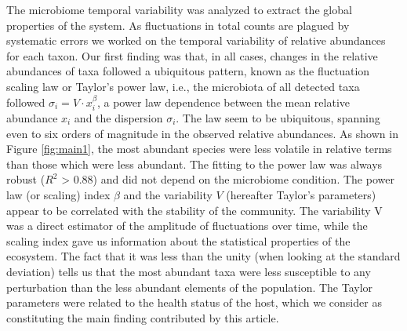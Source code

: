 
The microbiome temporal variability was analyzed to extract the global properties of the system. As fluctuations in total counts are plagued by systematic errors we worked on the temporal variability of relative abundances for each taxon. Our first finding was that, in all cases, changes in the relative abundances of taxa followed a ubiquitous pattern, known as the fluctuation scaling law\cite{fs} or Taylor's power law\cite{taylor}, i.e., the microbiota of all detected taxa followed $\sigma_i  = V\cdot x_i^{\beta}$, a power law dependence between the mean relative abundance $x_i$ and the dispersion $\sigma_i$. The law seem to be ubiquitous, spanning even to six orders of magnitude in the observed relative abundances. As shown in Figure \ref{fig:main1}, the most abundant species were less volatile in relative terms than those which were less abundant. The fitting to the power law was always robust ($R^{2}$ > 0.88) and did not depend on the microbiome condition. The power law (or scaling) index $\beta$ and the variability $V$ (hereafter Taylor's parameters) appear to be correlated with the stability of the community. The variability V was a direct estimator of the amplitude of fluctuations over time, while the scaling index gave us information about the statistical properties of the ecosystem. The fact that it was less than the unity (when looking at the standard deviation) tells us that the most abundant taxa were less susceptible to any perturbation than the less abundant elements of the population. The Taylor parameters were related to the health status of the host, which we consider as constituting the main finding contributed by this article.

